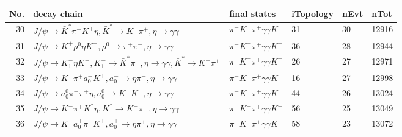 \begin{table}[htbp] 
\begin{center}
\begin{small}
\begin{tabular}{rlllll}\hline\hline
 No. & decay chain & final states &  iTopology & nEvt & nTot \\\hline
 30&$J/\psi       \rightarrow \bar{K}^{*}   \pi^{-}        K^{+}          \eta          , \bar{K}^{*}    \rightarrow K^{-}          \pi^{+}        , \eta           \rightarrow \gamma       \gamma       $&$\pi^{-}        K^{-}          \pi^{+}        \gamma       \gamma       K^{+}          $&   31&   30&12916\\
 31&$J/\psi       \rightarrow K^{+}          \rho^{0}      \eta          K^{-}          , \rho^{0}       \rightarrow \pi^{+}        \pi^{-}        , \eta           \rightarrow \gamma       \gamma       $&$\pi^{-}        K^{-}          \pi^{+}        \gamma       \gamma       K^{+}          $&   36&   28&12944\\
 32&$J/\psi       \rightarrow K_{1}^{-}      \eta          K^{+}          , K_{1}^{-}       \rightarrow \bar{K}^{*}   \pi^{-}        , \eta           \rightarrow \gamma       \gamma       , \bar{K}^{*}    \rightarrow K^{-}          \pi^{+}        $&$\pi^{-}        K^{-}          \pi^{+}        \gamma       \gamma       K^{+}          $&   26&   27&12971\\
 33&$J/\psi       \rightarrow K^{-}          \pi^{+}        a_{0}^{-}      K^{+}          , a_{0}^{-}       \rightarrow \eta          \pi^{-}        , \eta           \rightarrow \gamma       \gamma       $&$\pi^{-}        K^{-}          \pi^{+}        \gamma       \gamma       K^{+}          $&   16&   27&12998\\
 34&$J/\psi       \rightarrow a_{0}^{0}      \pi^{-}        \pi^{+}        \eta          , a_{0}^{0}       \rightarrow K^{+}          K^{-}          , \eta           \rightarrow \gamma       \gamma       $&$\pi^{-}        K^{-}          \pi^{+}        \gamma       \gamma       K^{+}          $&   44&   26&13024\\
 35&$J/\psi       \rightarrow K^{-}          \pi^{+}        K^{*}          \eta          , K^{*}           \rightarrow K^{+}          \pi^{-}        , \eta           \rightarrow \gamma       \gamma       $&$\pi^{-}        K^{-}          \pi^{+}        \gamma       \gamma       K^{+}          $&   56&   25&13049\\
 36&$J/\psi       \rightarrow K^{-}          a_{0}^{+}      \pi^{-}        K^{+}          , a_{0}^{+}       \rightarrow \eta          \pi^{+}        , \eta           \rightarrow \gamma       \gamma       $&$\pi^{-}        K^{-}          \pi^{+}        \gamma       \gamma       K^{+}          $&   58&   23&13072\\

\end{tabular}
\end{small}
\end{center}
\end{table}
